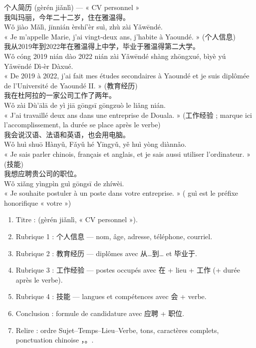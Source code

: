 \documentclass[11pt]{article}
\newcommand{\zh}[1]{\ifmmode\text{#1}\else{#1}\fi}
\begin{document}
\begin{textebox}
个人简历 (gèrén jiǎnlì) — « CV personnel »\\
我叫玛丽，今年二十二岁，住在雅温得。\\
Wǒ jiào Mǎlì, jīnnián èrshí'èr suì, zhù zài Yǎwēndé.\\
« Je m'appelle Marie, j'ai vingt-deux ans, j'habite à Yaoundé. » (个人信息)\\
我从2019年到2022年在雅温得上中学，毕业于雅温得第二大学。\\
Wǒ cóng 2019 nián dào 2022 nián zài Yǎwēndé shàng zhōngxué, bìyè yú Yǎwēndé Dì-èr Dàxué.\\
« De 2019 à 2022, j'ai fait mes études secondaires à Yaoundé et je suis diplômée de l'Université de Yaoundé II. » (教育经历)\\
我在杜阿拉的一家公司工作了两年。\\
Wǒ zài Dù'ālā de yì jiā gōngsī gōngzuò le liǎng nián.\\
« J'ai travaillé deux ans dans une entreprise de Douala. » (工作经验 ; \zh{了} marque ici l'accomplissement, la durée \zh{两年} se place après le verbe)\\
我会说汉语、法语和英语，也会用电脑。\\
Wǒ huì shuō Hànyǔ, Fǎyǔ hé Yīngyǔ, yě huì yòng diànnǎo.\\
« Je sais parler chinois, français et anglais, et je sais aussi utiliser l'ordinateur. » (技能)\\
我想应聘贵公司的职位。\\
Wǒ xiǎng yìngpìn guì gōngsī de zhíwèi.\\
« Je souhaite postuler à un poste dans votre entreprise. » (\zh{贵} guì est le préfixe honorifique « votre »)
\end{textebox}

\begin{methode}
\begin{enumerate}
\item Titre : \zh{个人简历} (gèrén jiǎnlì, « CV personnel »).
\item Rubrique 1 : 个人信息 — nom, âge, adresse, téléphone, courriel.
\item Rubrique 2 : 教育经历 — diplômes avec 从…到… et 毕业于.
\item Rubrique 3 : 工作经验 — postes occupés avec 在 + lieu + 工作 (+ durée après le verbe).
\item Rubrique 4 : 技能 — langues et compétences avec 会 + verbe.
\item Conclusion : formule de candidature avec 应聘 + 职位.
\item Relire : ordre Sujet–Temps–Lieu–Verbe, tons, caractères complets, ponctuation chinoise ，。.
\end{enumerate}
\end{methode}
\end{document}
